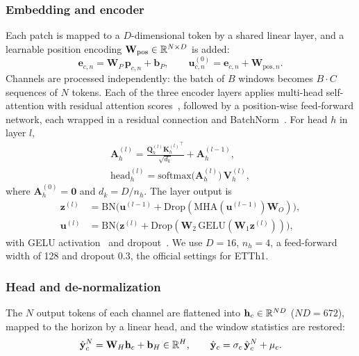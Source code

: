 \subsubsection{Embedding and encoder}
Each patch is mapped to a $D$-dimensional token by a shared linear layer, and a learnable position encoding $\mathbf{W}_{\mathrm{pos}}\in\mathbb{R}^{N\times D}$ is added:
\begin{equation}
\mathbf{e}_{c,n}=\mathbf{W}_P\,\mathbf{p}_{c,n}+\mathbf{b}_P,\qquad \mathbf{u}^{(0)}_{c,n}=\mathbf{e}_{c,n}+\mathbf{W}_{\mathrm{pos},n}.
\label{eq:embed}
\end{equation}
Channels are processed independently: the batch of $B$ windows becomes $B\cdot C$ sequences of $N$ tokens. Each of the three encoder layers applies multi-head self-attention with residual attention scores~\cite{realformer}, followed by a position-wise feed-forward network, each wrapped in a residual connection and BatchNorm~\cite{batchnorm}. For head $h$ in layer $l$,
\begin{equation}
\begin{gathered}
\mathbf{A}^{(l)}_h=\frac{\mathbf{Q}^{(l)}_h{\mathbf{K}^{(l)}_h}^{\top}}{\sqrt{d_k}}+\mathbf{A}^{(l-1)}_h,\\
\mathrm{head}^{(l)}_h=\mathrm{softmax}\big(\mathbf{A}^{(l)}_h\big)\,\mathbf{V}^{(l)}_h,
\end{gathered}
\label{eq:attn}
\end{equation}
where $\mathbf{A}^{(0)}_h=\mathbf{0}$ and $d_k=D/n_h$. The layer output is
\begin{align}
\mathbf{z}^{(l)}&=\mathrm{BN}\big(\mathbf{u}^{(l-1)}+\mathrm{Drop}(\mathrm{MHA}(\mathbf{u}^{(l-1)})\mathbf{W}_O)\big),\label{eq:layer1}\\
\mathbf{u}^{(l)}&=\mathrm{BN}\big(\mathbf{z}^{(l)}+\mathrm{Drop}(\mathbf{W}_2\,\mathrm{GELU}(\mathbf{W}_1\mathbf{z}^{(l)}))\big),\label{eq:layer2}
\end{align}
with GELU activation~\cite{gelu} and dropout~\cite{dropout}. We use $D=16$, $n_h=4$, a feed-forward width of 128 and dropout 0.3, the official settings for ETTh1.

\subsubsection{Head and de-normalization}
The $N$ output tokens of each channel are flattened into $\mathbf{h}_c\in\mathbb{R}^{ND}$ ($ND=672$), mapped to the horizon by a linear head, and the window statistics are restored:
\begin{equation}
\hat{\mathbf{y}}^{N}_c=\mathbf{W}_H\mathbf{h}_c+\mathbf{b}_H\in\mathbb{R}^{H},\qquad \hat{\mathbf{y}}_c=\sigma_c\,\hat{\mathbf{y}}^{N}_c+\mu_c.
\label{eq:head}
\end{equation}


